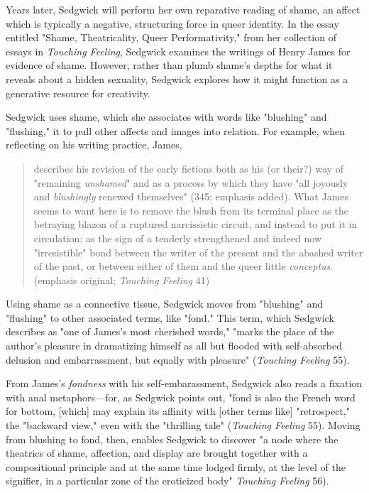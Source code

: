 \documentclass[11pt]{article}
\begin{document}
\begin{enumerate}
Years later, Sedgwick will perform her own reparative reading of
shame, an affect which is typically a negative, structuring force in
queer identity. In the essay entitled "Shame, Theatricality, Queer
Performativity," from her collection of essays in \emph{Touching Feeling},
Sedgwick examines the writings of Henry James for evidence of shame.
However, rather than plumb shame's depths for what it reveals about a
hidden sexuality, Sedgwick explores how it might function as a
generative resource for creativity.

Sedgwick uses shame, which she associates with words like "blushing"
and "flushing," it to pull other affects and images into relation. For
example, when reflecting on his writing practice, James,
\begin{quote}
describes his revision of the early fictions both as his (or their?)
way of "remaining \emph{unshamed}" and as a process by which they have "all
joyously and \emph{blushingly} renewed themselves" (345; emphasis added).
What James seems to want here is to remove the blush from its terminal
place as the betraying blazon of a ruptured narcissistic circuit, and
instead to put it in circulation: as the sign of a tenderly
strengthened and indeed now "irresistible" bond between the writer of
the present and the abashed writer of the past, or between either of
them and the queer little \emph{conceptus}. (emphasis original; \emph{Touching
Feeling} 41)
\end{quote}
Using shame as a connective tissue, Sedgwick moves from "blushing" and
"flushing" to other associated terms, like "fond." This term, which
Sedgwick describes as "one of James’s most cherished words," "marks
the place of the author’s pleasure in dramatizing himself as all but
flooded with self-absorbed delusion and embarrassment, but equally
with pleasure" (\emph{Touching Feeling} 55).

From James's \emph{fondness} with his self-embarassment, Sedgwick also
reads a fixation with anal metaphors---for, as Sedgwick points out,
"fond is also the French word for bottom, [which] may explain its
affinity with [other terms like] "retrospect," the "backward view,"
even with the "thrilling tale" (\emph{Touching Feeling} 55). Moving from
blushing to fond, then, enables Sedgwick to discover "a node where the
theatrics of shame, affection, and display are brought together with a
compositional principle and at the same time lodged firmly, at the
level of the signifier, in a particular zone of the eroticized body"
\emph{Touching Feeling} 56).


\end{enumerate}
\end{document}

